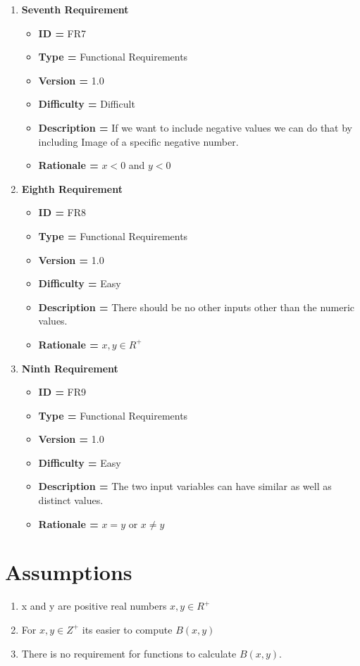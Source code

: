 \documentclass{report}
\begin{document}
\begin{enumerate}[noitemsep]
        \newpage
        \item \textbf{Seventh Requirement}
        \begin{itemize}
            \item \textbf{ID = } FR7
            \item\textbf{Type = } Functional Requirements
            \item\textbf{Version = } 1.0
            \item\textbf{Difficulty = } Difficult
            \item\textbf{Description = } If we want to include negative values we can do that by including Image of a specific negative number.
            \item\textbf{Rationale = } $x<0$ and $y<0$
        \end{itemize}
        \item \textbf{Eighth Requirement}
        \begin{itemize}
            \item \textbf{ID = } FR8
            \item\textbf{Type = } Functional Requirements
            \item\textbf{Version = } 1.0
            \item\textbf{Difficulty = } Easy
            \item\textbf{Description = } There should be no other inputs other than the numeric values.
            \item\textbf{Rationale = }$ x,y \in R^+$
        \end{itemize}

        \item \textbf{Ninth Requirement}
        \begin{itemize}
            \item \textbf{ID = } FR9
            \item\textbf{Type = } Functional Requirements
            \item\textbf{Version = } 1.0
            \item\textbf{Difficulty = } Easy
            \item\textbf{Description = } The two input variables can have similar as well as distinct values.
            \item\textbf{Rationale = } $x=y$ or $x\neq y$
        \end{itemize}
    \end{enumerate}
\section*{Assumptions}
    \begin{enumerate}[noitemsep]
        \item x and y are positive real numbers $x,y \in R^+$
        \item For $x,y \in Z^+$ its easier to compute $B(x,y)$
        \item There is no requirement for functions to calculate $B(x,y)$.

    \end{enumerate}
    
\end{document}
